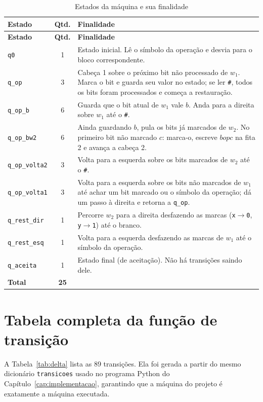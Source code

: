 \documentclass[report, 12pt]{uftreport}
\newcommand{\s}[1]{\texttt{#1}}
\begin{document}
\begin{longtable}{>{\raggedright\arraybackslash}p{3.0cm} c >{\raggedright\arraybackslash}p{8.6cm}}
\caption{Estados da máquina e sua finalidade}\label{tab:estados}\\
\toprule
\textbf{Estado} & \textbf{Qtd.} & \textbf{Finalidade} \\
\midrule
\endfirsthead
\toprule
\textbf{Estado} & \textbf{Qtd.} & \textbf{Finalidade} \\
\midrule
\endhead
\s{q0} & 1 & Estado inicial. Lê o símbolo da operação e desvia para o bloco correspondente. \\
\s{q\_op} & 3 & Cabeça 1 sobre o próximo bit não processado de $w_1$. Marca o bit e guarda seu valor no estado; se ler \s{\#}, todos os bits foram processados e começa a restauração. \\
\s{q\_op\_b} & 6 & Guarda que o bit atual de $w_1$ vale $b$. Anda para a direita sobre $w_1$ até o \s{\#}. \\
\s{q\_op\_bw2} & 6 & Ainda guardando $b$, pula os bits já marcados de $w_2$. No primeiro bit não marcado $c$: marca-o, escreve $b \mathbin{op} c$ na fita 2 e avança a cabeça 2. \\
\s{q\_op\_volta2} & 3 & Volta para a esquerda sobre os bits marcados de $w_2$ até o \s{\#}. \\
\s{q\_op\_volta1} & 3 & Volta para a esquerda sobre os bits não marcados de $w_1$ até achar um bit marcado ou o símbolo da operação; dá um passo à direita e retorna a \s{q\_op}. \\
\s{q\_rest\_dir} & 1 & Percorre $w_2$ para a direita desfazendo as marcas (\s{x}$\to$\s{0}, \s{y}$\to$\s{1}) até o branco. \\
\s{q\_rest\_esq} & 1 & Volta para a esquerda desfazendo as marcas de $w_1$ até o símbolo da operação. \\
\s{q\_aceita} & 1 & Estado final (de aceitação). Não há transições saindo dele. \\
\midrule
\textbf{Total} & \textbf{25} & \\
\bottomrule
\end{longtable}

\section{Tabela completa da função de transição}
\label{sec:delta}

A Tabela~\ref{tab:delta} lista as 89 transições. Ela foi gerada a partir do mesmo
dicionário \s{transicoes} usado no programa Python do
Capítulo~\ref{cap:implementacao}, garantindo que a máquina do projeto é exatamente a
máquina executada.
\end{document}
